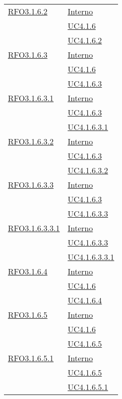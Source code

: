 \begin{longtable}{|>{\centering}m{5cm}|m{5cm}<{\centering}|}
\hyperlink{RFO3.1.6.2}{RFO3.1.6.2} & \hyperlink{Interno}{Interno}\\
& \hyperref[UC4.1.6]{UC4.1.6}\\
& \hyperref[UC4.1.6.2]{UC4.1.6.2}\\ \hline

\hyperlink{RFO3.1.6.3}{RFO3.1.6.3} & \hyperlink{Interno}{Interno}\\
& \hyperref[UC4.1.6]{UC4.1.6}\\
& \hyperref[UC4.1.6.3]{UC4.1.6.3}\\ \hline

\hyperlink{RFO3.1.6.3.1}{RFO3.1.6.3.1} & \hyperlink{Interno}{Interno}\\
& \hyperref[UC4.1.6.3]{UC4.1.6.3}\\
& \hyperref[UC4.1.6.3.1]{UC4.1.6.3.1}\\ \hline

\hyperlink{RFO3.1.6.3.2}{RFO3.1.6.3.2} & \hyperlink{Interno}{Interno}\\
& \hyperref[UC4.1.6.3]{UC4.1.6.3}\\
& \hyperref[UC4.1.6.3.2]{UC4.1.6.3.2}\\ \hline

\hyperlink{RFO3.1.6.3.3}{RFO3.1.6.3.3} & \hyperlink{Interno}{Interno}\\
& \hyperref[UC4.1.6.3]{UC4.1.6.3}\\
& \hyperref[UC4.1.6.3.3]{UC4.1.6.3.3}\\ \hline

\hyperlink{RFO3.1.6.3.3.1}{RFO3.1.6.3.3.1} & \hyperlink{Interno}{Interno}\\
& \hyperref[UC4.1.6.3.3]{UC4.1.6.3.3}\\
& \hyperref[UC4.1.6.3.3.1]{UC4.1.6.3.3.1}\\ \hline

\hyperlink{RFO3.1.6.4}{RFO3.1.6.4} & \hyperlink{Interno}{Interno}\\
& \hyperref[UC4.1.6]{UC4.1.6}\\
& \hyperref[UC4.1.6.4]{UC4.1.6.4}\\ \hline

\hyperlink{RFO3.1.6.5}{RFO3.1.6.5} & \hyperlink{Interno}{Interno}\\
& \hyperref[UC4.1.6]{UC4.1.6}\\
& \hyperref[UC4.1.6.5]{UC4.1.6.5}\\ \hline

\hyperlink{RFO3.1.6.5.1}{RFO3.1.6.5.1} & \hyperlink{Interno}{Interno}\\
& \hyperref[UC4.1.6.5]{UC4.1.6.5}\\
& \hyperref[UC4.1.6.5.1]{UC4.1.6.5.1}\\ \hline


\end{longtable}

